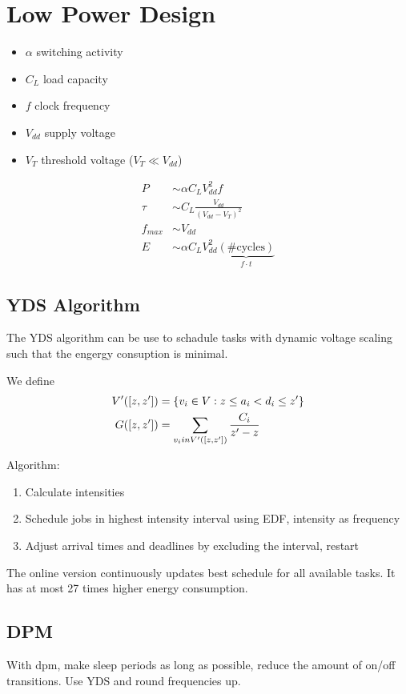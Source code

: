 \section{Low Power Design}
\begin{itemize}
	\item $\alpha$ switching activity
	\item $C_L$ load capacity
	\item $f$ clock frequency
	\item $V_{dd}$ supply voltage
	\item $V_T$ threshold voltage ($V_T \ll V_{dd}$)
\end{itemize}
\begin{align*}
	P &\sim \alpha C_L V_{dd}^2 f \\
	\tau &\sim C_L \frac{V_{dd}}{\left(V_{dd} - V_{T}\right)^2} \\
	f_{max} &\sim V_{dd} \\
	E &\sim \alpha C_L V_{dd}^2 \underbrace{\left(\text{\#cycles}\right)}_{f \cdot t}
\end{align*}

\subsection{YDS Algorithm}
The YDS algorithm can be use to schadule tasks with dynamic voltage scaling such
that the engergy consuption is minimal.

We define
\begin{align*}
	V'([z, z']) &= \left\lbrace v_i \in V: z \leq a_i < d_i \leq z' \right\rbrace \\
	G([z, z']) &= \sum_{v_i in V'([z,z'])} \frac{C_i}{z' - z}
\end{align*}

Algorithm:
\begin{enumerate}
	\item Calculate intensities
	\item Schedule jobs in highest intensity interval using EDF, intensity as
		frequency
	\item Adjust arrival times and deadlines by excluding the interval, restart
\end{enumerate}

The online version continuously updates best schedule for all available tasks.
It has at most 27 times higher energy consumption.

\subsection{DPM}
With dpm, make sleep periods as long as possible, reduce the amount of on/off
transitions. Use YDS and round frequencies up.
